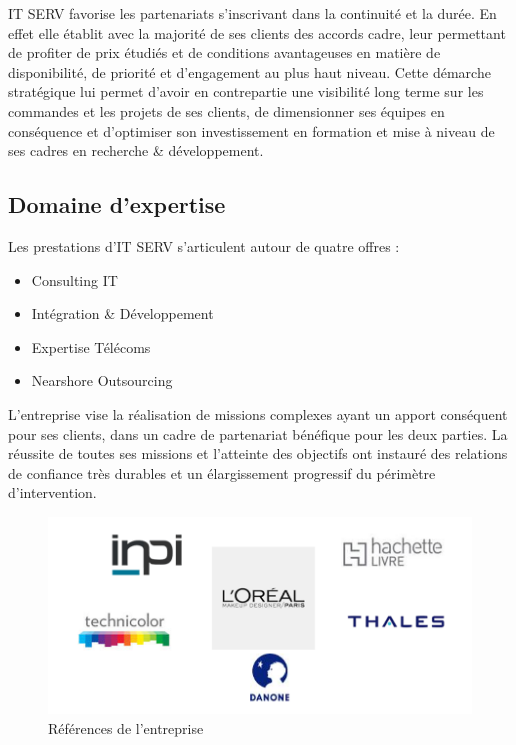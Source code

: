 \begin{spacing}{1.5}
IT SERV favorise les partenariats s'inscrivant dans la continuité et la durée. En effet elle établit avec la majorité de ses clients des accords cadre, leur permettant de profiter de prix étudiés et de conditions avantageuses en matière de disponibilité, de priorité et d'engagement au plus haut niveau. Cette démarche stratégique lui permet d'avoir en contrepartie une visibilité long terme sur les commandes et les projets de ses clients, de dimensionner ses équipes en conséquence et d'optimiser son investissement en formation et mise à niveau de ses cadres en recherche \& développement.

\subsection{Domaine d'expertise}
Les prestations d'IT SERV s'articulent autour de quatre offres :
\begin{itemize}
\item Consulting IT
    \item Intégration \& Développement
    \item Expertise Télécoms
    \item Nearshore Outsourcing
\end{itemize}
L'entreprise vise la réalisation de missions complexes ayant un apport conséquent pour ses clients, dans un cadre de partenariat bénéfique pour les deux parties. La réussite de toutes ses missions et l'atteinte des objectifs ont instauré des relations de confiance très durables et un élargissement progressif du périmètre d'intervention.

\begin{figure}[!ht]
\centering
\includegraphics[scale=0.8]{reference.png}
\caption{Références de l'entreprise}
\label{refenrences}
\end{figure}


\end{spacing}
